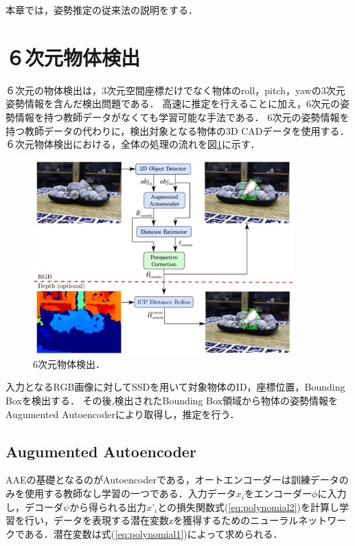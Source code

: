 本章では，姿勢推定の従来法の説明をする．


\section{６次元物体検出}
６次元の物体検出は，3次元空間座標だけでなく物体のroll，pitch，yawの3次元姿勢情報を含んだ検出問題である．
高速に推定を行えることに加え，6次元の姿勢情報を持つ教師データがなくても学習可能な手法である．
6次元の姿勢情報を持つ教師データの代わりに，検出対象となる物体の3D CADデータを使用する．
６次元物体検出における，全体の処理の流れを図\ref{fig:2d_pose_estimation}\cite{AAE}に示す．
      \begin{figure}[htbp]
      \begin{center}
      \includegraphics[width=100mm]{figure/eps/6次元推定.eps}
      \caption{6次元物体検出．}
      \label{fig:2d_pose_estimation}
      \end{center}
      \end{figure}



入力となるRGB画像に対してSSD\cite{SSD}を用いて対象物体のID，座標位置，Bounding Boxを検出する．
その後,検出されたBounding Box領域から物体の姿勢情報をAugumented Autoencoderにより取得し，推定を行う．
 


\subsection{Augumented Autoencoder}
AAEの基礎となるのがAutoencoder\cite{AE}である，オートエンコーダーは訓練データのみを使用する教師なし学習の一つである．入力データ$x_i$をエンコーダー$\phi$に入力し，デコーダ$\psi$から得られる出力$x’_i$との損失関数式(\ref{eq:polynomial2})を計算し学習を行い，データを表現する潜在変数zを獲得するためのニューラルネットワークである．潜在変数は式(\ref{eq:polynomial1})によって求められる．

